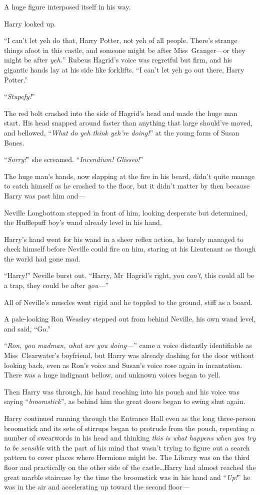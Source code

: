 A huge figure interposed itself in his way.

Harry looked up.

“I can’t let yeh do that, Harry Potter, not yeh of all people. There’s strange
things afoot in this castle, and someone might be after Miss~Granger—or they
might be after \emph{yeh.}” Rubeus Hagrid’s voice was regretful but firm, and
his gigantic hands lay at his side like forklifts. “I can’t let yeh go out
there, Harry Potter.”

“\emph{Stupefy!}”

The red bolt crashed into the side of Hagrid’s head and made the huge man
start. His head snapped around faster than anything that large should’ve
moved, and bellowed, “\emph{What do yeh think yeh’re doing!}” at the young form
of Susan Bones.

“\emph{Sorry!}” she screamed. “\emph{Incendium! Glisseo!}”

The huge man’s hands, now slapping at the fire in his beard, didn’t quite
manage to catch himself as he crashed to the floor, but it didn’t matter by
then because Harry was past him and—

Neville Longbottom stepped in front of him, looking desperate but determined,
the Hufflepuff boy’s wand already level in his hand.

Harry’s hand went for his wand in a sheer reflex action, he barely managed to
check himself before Neville could fire on him, staring at his Lieutenant as
though the world had gone mad.

“Harry!” Neville burst out. “Harry, Mr~Hagrid’s right, you \emph{can’t}, this
could all be a trap, they could be after \emph{you—}”

All of Neville’s muscles went rigid and he toppled to the ground, stiff as a
board.

A pale-looking Ron Weasley stepped out from behind Neville, his own wand level,
and said, “Go.”

“\emph{Ron, you madman, what are you doing—}” came a voice distantly
identifiable as Miss~Clearwater’s boyfriend, but Harry was already dashing for
the door without looking back, even as Ron’s voice and Susan’s voice rose again
in incantation. There was a huge indignant bellow, and unknown voices began to
yell.

Then Harry was through, his hand reaching into his pouch and his voice was
saying “\emph{broomstick}”, as behind him the great doors began to swing shut
again.

Harry continued running through the Entrance Hall even as the long three-person
broomstick and its sets of stirrups began to protrude from the pouch, repeating
a number of swearwords in his head and thinking \emph{this is what happens when
you try to be sensible} with the part of his mind that wasn’t trying to figure
out a search pattern to cover places where Hermione might be. The Library was
on the third floor and practically on the other side of the castle…Harry
had almost reached the great marble staircase by the time the broomstick
was in his hand and “\emph{Up!}” he was in the air and accelerating up toward
the second floor—

